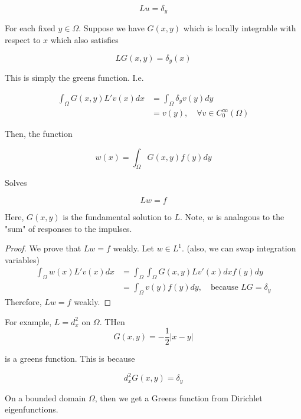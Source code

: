\documentclass{article}
\newtheorem{one minute paper}[theorem]{One Minute Paper}
\begin{document}
\begin{equation}
    Lu = \delta_y
\end{equation}

For each fixed $y \in \Omega$. Suppose we have $G(x,y)$ which is locally integrable with respect to $x$ which also satisfies 

\begin{equation}
    LG(x,y) = \delta_y(x)
\end{equation}

This is simply the greens function. I.e. 

\begin{align*}
    \int_{\Omega}G(x,y)L'v(x) dx &= \int_{\Omega}\delta_y v(y)dy \\
    &= v(y), \quad \forall v \in C^{\infty}_{0}(\Omega)
\end{align*}

Then, the function 

\begin{equation}
    w(x) = \int_\Omega G(x,y)f(y)dy
\end{equation}

Solves 

\begin{equation}
    Lw = f
\end{equation}

Here, $G(x,y)$ is the fundamental solution to $L$. Note, $w$ is analagous to the "sum" of responses to the impulses. 

\begin{proof}
    We prove that $Lw = f$ weakly. Let $w \in L^1$. (also, we can swap integration variables) 
    \begin{align}
        \int_{\Omega} w(x)L'v(x) dx &= \int_{\Omega}\int_{\Omega}G(x,y)Lv'(x)dx f(y)dy \\
        &= \int_{\Omega}v(y)f(y)dy, \quad \text{because } LG = \delta_y
    \end{align}
    Therefore, $Lw = f$ weakly. 
\end{proof}

For example, $L = d_x^2$ on $\Omega$. THen $$G(x,y) = -\frac{1}{2}|x-y|$$

is a greens function. This is because 

\begin{equation}
    d_x^2 G(x,y) = \delta_y
\end{equation}

On a bounded domain $\Omega$, then we get a Greens function from Dirichlet eigenfunctions. 
\end{document}
